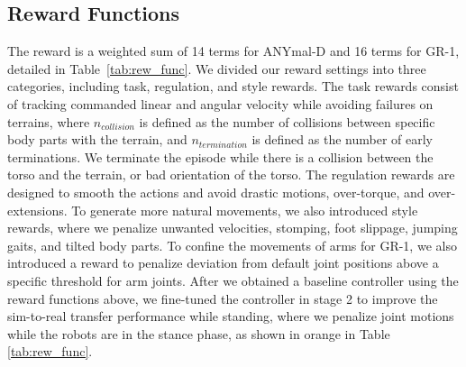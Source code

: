 \documentclass[9pt,twocolumn,twoside]{osajnl}
\begin{document}
\subsection*{Reward Functions}
The reward is a weighted sum of 14 terms for ANYmal-D and 16 terms for GR-1, detailed in Table~\ref{tab:rew_func}. We divided our reward settings into three categories, including task, regulation, and style rewards. The task rewards consist of tracking commanded linear and angular velocity while avoiding failures on terrains, where $n_{collision}$ is defined as the number of collisions between specific body parts with the terrain, and $n_{termination}$ is defined as the number of early terminations. We terminate the episode while there is a collision between the torso and the terrain, or bad orientation of the torso. The regulation rewards are designed to smooth the actions and avoid drastic motions, over-torque, and over-extensions. To generate more natural movements, we also introduced style rewards, where we penalize unwanted velocities, stomping, foot slippage, jumping gaits, and tilted body parts. To confine the movements of arms for GR-1, we also introduced a reward to penalize deviation from default joint positions above a specific threshold for arm joints. After we obtained a baseline controller using the reward functions above, we fine-tuned the controller in stage 2 to improve the sim-to-real transfer performance while standing, where we penalize joint motions while the robots are in the stance phase, as shown in orange in Table \ref{tab:rew_func}.
\end{document}
